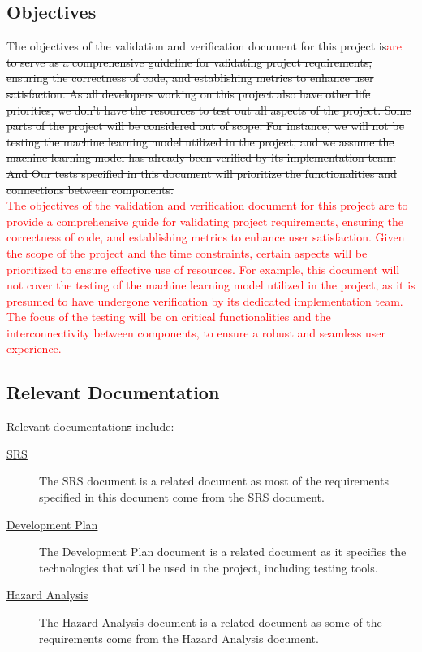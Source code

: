 \documentclass[12pt, titlepage]{article}
\newcommand{\rt}[1]{\textcolor{red}{#1}}
\begin{document}
\subsection{Objectives}

\sout{The objectives of the validation and verification document for this project \sout{is}\rt{are}
to serve as a comprehensive guideline for validating project requirements,
ensuring the correctness of code, and establishing metrics to enhance user
satisfaction. As all developers working on this project also have other life
priorities, we don’t have the resources to test out all aspects of the project.
Some parts of the project will be considered out of scope. For instance, we will
not be testing the machine learning model utilized in the project, and we assume
the machine learning model has already been verified by its implementation team.
\sout{And} Our tests specified in this document will prioritize the functionalities and
connections between components.}\\
\rt{The objectives of the validation and verification document for this project are to provide 
a comprehensive guide for validating project requirements, ensuring the correctness of code, 
and establishing metrics to enhance user satisfaction. Given the scope of the project and the 
time constraints, certain aspects will be prioritized to ensure effective use of resources. For 
example, this document will not cover the testing of the machine learning model utilized in the 
project, as it is presumed to have undergone verification by its dedicated implementation team. 
The focus of the testing will be on critical functionalities and the interconnectivity between 
components, to ensure a robust and seamless user experience.}


\subsection{Relevant Documentation}

Relevant documentation\sout{s} include:
\begin{description}
\item[\href{https://github.com/InfiniView-AI/MotionMingle/blob/main/docs/SRS/SRS.pdf}{SRS}]
  The SRS document is a related document as most of the requirements specified
  in this document come from the SRS document.
\item[\href{https://github.com/InfiniView-AI/MotionMingle/blob/main/docs/DevelopmentPlan/DevelopmentPlan.pdf}{Development Plan}]
  The Development Plan document is a related document as it specifies the
  technologies that will be used in the project, including testing tools.
\item[\href{https://github.com/InfiniView-AI/MotionMingle/blob/main/docs/HazardAnalysis/HazardAnalysis.pdf}{Hazard Analysis}]
  The Hazard Analysis document is a related document as some of the requirements
  come from the Hazard Analysis document.
\end{description}
\end{document}
